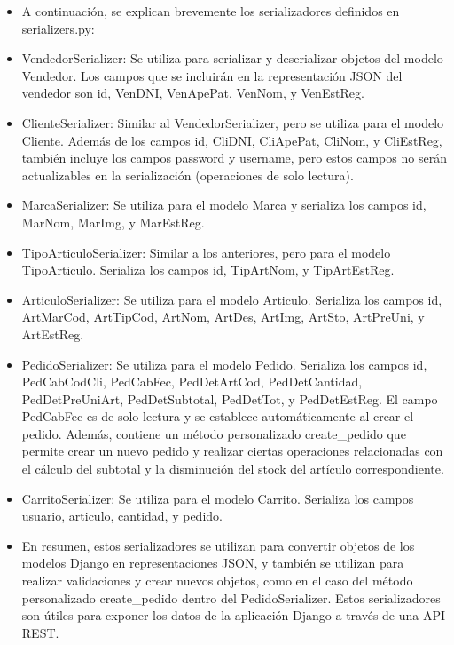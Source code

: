 \documentclass{article}
\begin{document}
    \begin{itemize}
        \item A continuación, se explican brevemente los serializadores definidos en serializers.py:
        \item VendedorSerializer: Se utiliza para serializar y deserializar objetos del modelo Vendedor. Los campos que se incluirán en la representación JSON del vendedor son id, VenDNI, VenApePat, VenNom, y VenEstReg.
        \item ClienteSerializer: Similar al VendedorSerializer, pero se utiliza para el modelo Cliente. Además de los campos id, CliDNI, CliApePat, CliNom, y CliEstReg, también incluye los campos password y username, pero estos campos no serán actualizables en la serialización (operaciones de solo lectura).
        \item MarcaSerializer: Se utiliza para el modelo Marca y serializa los campos id, MarNom, MarImg, y MarEstReg.
        \item TipoArticuloSerializer: Similar a los anteriores, pero para el modelo TipoArticulo. Serializa los campos id, TipArtNom, y TipArtEstReg.
        \item ArticuloSerializer: Se utiliza para el modelo Articulo. Serializa los campos id, ArtMarCod, ArtTipCod, ArtNom, ArtDes, ArtImg, ArtSto, ArtPreUni, y ArtEstReg.
        \item PedidoSerializer: Se utiliza para el modelo Pedido. Serializa los campos id, PedCabCodCli, PedCabFec, PedDetArtCod, PedDetCantidad, PedDetPreUniArt, PedDetSubtotal, PedDetTot, y PedDetEstReg. El campo PedCabFec es de solo lectura y se establece automáticamente al crear el pedido. Además, contiene un método personalizado create\_pedido que permite crear un nuevo pedido y realizar ciertas operaciones relacionadas con el cálculo del subtotal y la disminución del stock del artículo correspondiente.
        \item CarritoSerializer: Se utiliza para el modelo Carrito. Serializa los campos usuario, articulo, cantidad, y pedido.
        \item En resumen, estos serializadores se utilizan para convertir objetos de los modelos Django en representaciones JSON, y también se utilizan para realizar validaciones y crear nuevos objetos, como en el caso del método personalizado create\_pedido dentro del PedidoSerializer. Estos serializadores son útiles para exponer los datos de la aplicación Django a través de una API REST.
    \end{itemize}
    
\end{document}
